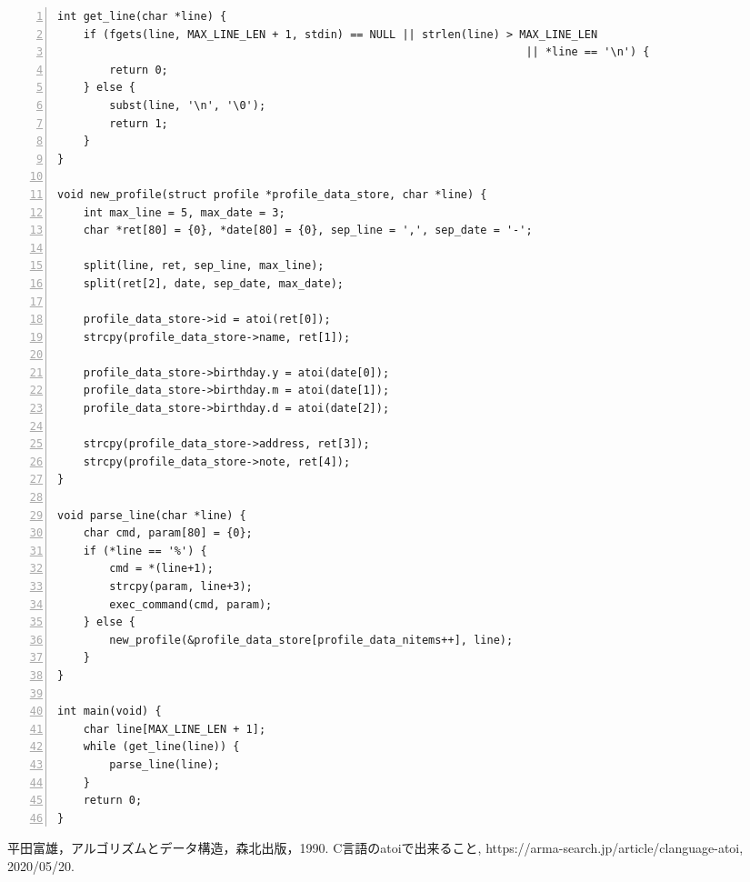 \documentclass[autodetect-engine,dvi=dvipdfmx,ja=standard,
               a4j,11pt]{bxjsarticle}
\begin{document}
\begin{Verbatim}[numbers=left, xleftmargin=10mm, numbersep=6pt,
  fontsize=\small, baselinestretch=0.8]
int get_line(char *line) {
    if (fgets(line, MAX_LINE_LEN + 1, stdin) == NULL || strlen(line) > MAX_LINE_LEN
                                                                        || *line == '\n') {
        return 0;
    } else {
        subst(line, '\n', '\0');
        return 1;
    }
}

void new_profile(struct profile *profile_data_store, char *line) {
    int max_line = 5, max_date = 3;
    char *ret[80] = {0}, *date[80] = {0}, sep_line = ',', sep_date = '-';

    split(line, ret, sep_line, max_line);
    split(ret[2], date, sep_date, max_date);

    profile_data_store->id = atoi(ret[0]);
    strcpy(profile_data_store->name, ret[1]);

    profile_data_store->birthday.y = atoi(date[0]);
    profile_data_store->birthday.m = atoi(date[1]);
    profile_data_store->birthday.d = atoi(date[2]);

    strcpy(profile_data_store->address, ret[3]);
    strcpy(profile_data_store->note, ret[4]);
}

void parse_line(char *line) {
    char cmd, param[80] = {0};
    if (*line == '%') {
        cmd = *(line+1);
        strcpy(param, line+3);
        exec_command(cmd, param);
    } else {
        new_profile(&profile_data_store[profile_data_nitems++], line);
    }
}

int main(void) {
    char line[MAX_LINE_LEN + 1];
    while (get_line(line)) {
        parse_line(line);
    }
    return 0;
}

\end{Verbatim}


\begin{thebibliography}{99}
   平田富雄，アルゴリズムとデータ構造，森北出版，1990.
   C言語のatoiで出来ること, https://arma-search.jp/article/clanguage-atoi, 2020/05/20.
\end{thebibliography}

\end{document}
